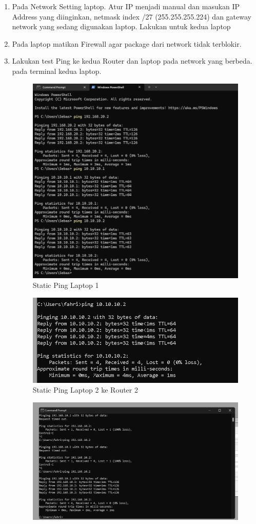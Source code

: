 \begin{enumerate}
    \item Pada Network Setting laptop. Atur IP menjadi manual dan masukan IP Address yang diinginkan, netmask index /27 (255.255.255.224) dan gateway network yang sedang digunakan laptop. Lakukan untuk kedua laptop

    \item Pada laptop matikan Firewall agar package dari network tidak terblokir.

    \item Lakukan test Ping ke kedua Router dan laptop pada network yang berbeda. pada terminal kedua laptop.
        \begin{figure}[H]
            \centering
            \includegraphics[width=0.5\linewidth]{P1/img/static.png}
            \caption{Static Ping Laptop 1}
            \label{fig:enter-label}
        \end{figure}
        \begin{figure}[H]
            \centering
            \includegraphics[width=0.5\linewidth]{P1/img/ping.png}
            \caption{Static Ping Laptop 2 ke Router 2}
            \label{fig:enter-label}
        \end{figure}
        \begin{figure}[H]
            \centering
            \includegraphics[width=0.5\linewidth]{P1/img/ping 2.png}

\end{figure}
\end{enumerate}
